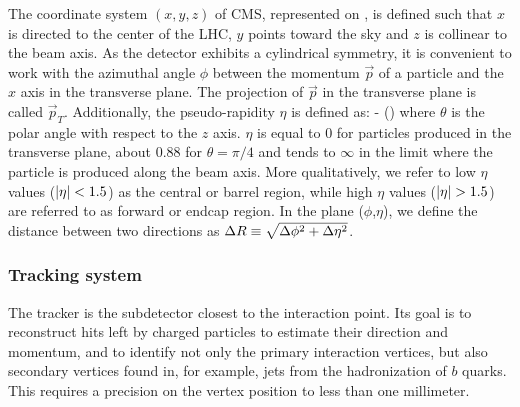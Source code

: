 
    The coordinate system $(x,y,z)$ of CMS, represented on ,
    is defined such that $x$ is directed to the center of the LHC, $y$ points toward
    the sky and $z$ is collinear to the beam axis. As the detector exhibits a
    cylindrical symmetry, it is convenient to work with the azimuthal angle $\phi$
    between the momentum $\vec{p}$ of a particle and the $x$ axis in the transverse
    plane. The projection of $\vec{p}$ in the transverse plane is called $\vec{p}_T$.
    Additionally, the pseudo-rapidity $\eta$ is defined as:
    {
        \eta {} - ()
    }
    where $\theta$ is the polar angle with respect to the $z$ axis. $\eta$ is equal
    to 0 for particles produced in
    the transverse plane, about 0.88 for $\theta = \pi/4$ and tends to $\infty$ in the
    limit where the particle is produced along the beam axis. More qualitatively, we
    refer to low $\eta$ values ($\left| \eta \right| < 1.5$) as the central or barrel region, while
    high $\eta$ values ($\left| \eta \right| > 1.5$) are referred to as forward or endcap region.
    In the plane ($\phi$,$\eta$), we define the distance between two directions as
    $\Delta R \equiv \sqrt{\Delta\phi^2 + \Delta \eta^2}$.


        \subsubsection{Tracking system}

    The tracker is the subdetector closest to the interaction point. Its goal
    is to reconstruct hits left by charged particles to estimate their direction
    and momentum, and to identify not only the primary interaction vertices, but also
    secondary vertices found in, for example, jets from the hadronization of $b$ quarks.
    This requires a precision on the vertex position to less than one millimeter.

